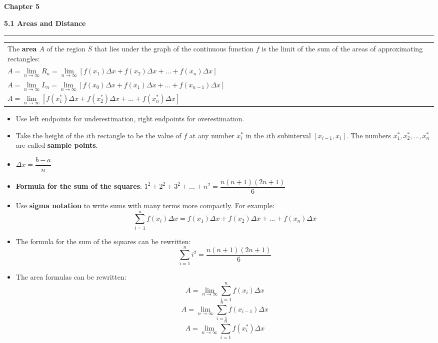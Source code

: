 \documentclass[fleqn]{article}
\begin{document}
\Huge\textbf{Chapter 5}
\vspace{16pt}

\begin{center}
\Large\textbf{5.1 Areas and Distance}

\noindent\hfill\rule{0.3\textwidth}{.4pt}\hfill
\vspace{12pt}

\large
\def\arraystretch{1.3}
{\setlength{\tabcolsep}{16pt}
\begin{tabularx}{.9\textwidth}{|X|}
\hline
	\vspace{1pt}
	The \textbf{area} $A$ of the region $S$ that lies under the graph of the continuous function $f$ is the limit of the sum of the areas of approximating rectangles: \\[10pt]

	$A = \underset{n \to \infty}{\lim} R_n = \underset{n \to \infty}{\lim} [f(x_1) \Delta x + f(x_2) \Delta x + ... + f(x_n) \Delta x]$ \\[10pt]
	$A = \underset{n \to \infty}{\lim} L_n = \underset{n \to \infty}{\lim} [f(x_0) \Delta x + f(x_1) \Delta x + ... + f(x_{n-1}) \Delta x]$ \\[10pt]
	$A = \underset{n \to \infty}{\lim} [f(x_1^*) \Delta x + f(x_2^*) \Delta x + ... + f(x_n^*) \Delta x]$ \\[16pt]
\hline
\end{tabularx}}
\vspace{12pt}

\begin{itemize}
	\item Use left endpoints for underestimation, right endpoints for overestimation. 
	\item Take the height of the $i$th rectangle to be the value of $f$ at any number $x_i^*$ in the $i$th subinterval $[x_{i-1}, x_i]$. The numbers $x_1^*, x_2^*, ... , x_n^*$ are called \textbf{sample points}.
	\item $\Delta x = \dfrac{b-a}{n}$ 
	\item \textbf{Formula for the sum of the squares}: $1^2 + 2^2 +3^2 + ... + n^2 = \dfrac {n(n+1)(2n+1)}{6}$
	\item Use \textbf{sigma notation} to write sums with many terms more compactly. For example:  \[\sum_{i=1}^n f(x_i) \Delta x = f(x_1) \Delta x + f(x_2) \Delta x + ... + f(x_n) \Delta x\]
	\item The formula for the sum of the squares can be rewritten: \[\sum_{i=1}^n i^2 = \dfrac{n(n+1)(2n+1)}{6}\]
	\item The area formulas can be rewritten: 
		\[A = \underset{n \to \infty}{\lim} \sum_{i=1}^n f(x_i) \Delta x\]
		\[A = \underset{n \to \infty}{\lim} \sum_{i=1}^n f(x_{i-1}) \Delta x\]
		\[A = \underset{n \to \infty}{\lim} \sum_{i=1}^n f(x_i^*) \Delta x\]
\end{itemize}
\end{center}
\pagebreak
\end{document}
